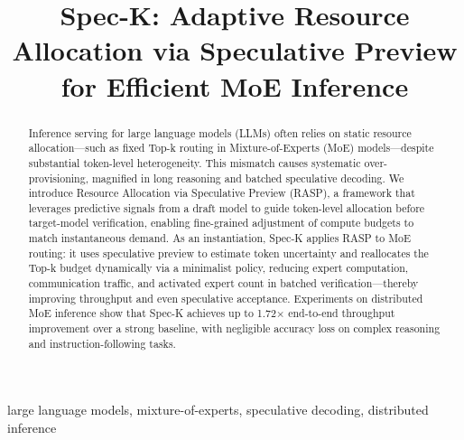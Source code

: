 \documentclass[conference]{IEEEtran}
\theoremstyle{definition} %
\begin{document}
\title{Spec-K: Adaptive Resource Allocation via Speculative Preview for Efficient MoE Inference}

\author{
\and
{}
}

\maketitle
\thispagestyle{fancy}
\lhead{}
\rhead{}
\chead{}
\rfoot{}
\cfoot{}
\renewcommand{\headrulewidth}{0pt}
\renewcommand{\footrulewidth}{0pt}

\begin{abstract}
Inference serving for large language models (LLMs) often relies on static resource allocation---such as fixed Top-k routing in Mixture-of-Experts (MoE) models---despite substantial token-level heterogeneity. This mismatch causes systematic over-provisioning, magnified in long reasoning and batched speculative decoding.
We introduce Resource Allocation via Speculative Preview (RASP), a framework that leverages predictive signals from a draft model to guide token-level allocation before target-model verification, enabling fine-grained adjustment of compute budgets to match instantaneous demand.
As an instantiation, Spec-K applies RASP to MoE routing: it uses speculative preview to estimate token uncertainty and reallocates the Top-k budget dynamically via a minimalist policy, reducing expert computation, communication traffic, and activated expert count in batched verification---thereby improving throughput and even speculative acceptance.
Experiments on distributed MoE inference show that Spec-K achieves up to 1.72× end-to-end throughput improvement over a strong baseline, with negligible accuracy loss on complex reasoning and instruction-following tasks.
\end{abstract}

\begin{IEEEkeywords}
large language models, mixture-of-experts, speculative decoding, distributed inference
\end{IEEEkeywords}
\end{document}
